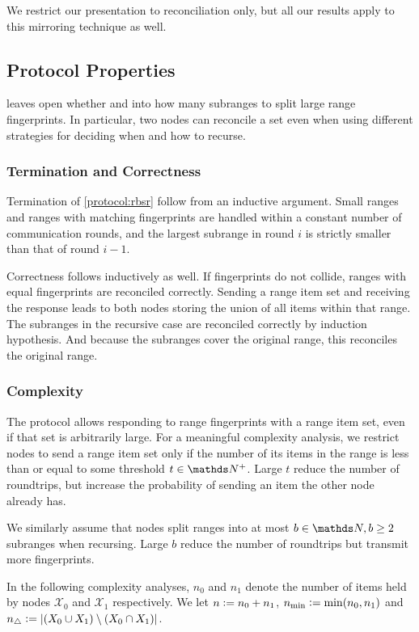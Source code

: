 \documentclass[conference]{IEEEtran}
\newcommand{\peer}[1]{\ensuremath{\mathcal{X}_{#1}}}
\begin{document}
We restrict our presentation to reconciliation only, but all our results apply to this mirroring technique as well.

\subsection{Protocol Properties}
 leaves open whether and into how many subranges to split large range fingerprints. In particular, two nodes can reconcile a set even when using different strategies for deciding when and how to recurse.

\subsubsection{Termination and Correctness}

Termination of \cref{protocol:rbsr} follow from an inductive argument. Small ranges and ranges with matching fingerprints are handled within a constant number of communication rounds, and the largest subrange in round $i$ is strictly smaller than that of round $i - 1$.

Correctness follows inductively as well. If fingerprints do not collide, ranges with equal fingerprints are reconciled correctly. Sending a range item set and receiving the response leads to both nodes storing the union of all items within that range. The subranges in the recursive case are reconciled correctly by induction hypothesis. And because the subranges cover the original range, this reconciles the original range.

\subsubsection{Complexity}

The protocol allows responding to range fingerprints with a range item set, even if that set is arbitrarily large. For a meaningful complexity analysis, we restrict nodes to send a range item set only if the number of its items in the range is less than or equal to some threshold $t \in \Np$. Large $t$ reduce the number of roundtrips, but increase the probability of sending an item the other node already has.

We similarly assume that nodes split ranges into at most $b \in \N, b \geq 2$ subranges when recursing. Large $b$ reduce the number of roundtrips but transmit more fingerprints.

In the following complexity analyses, $n_0$ and $n_1$ denote the number of items held by nodes \peer{0} and \peer{1} respectively. We let $n \vcentcolon= n_0 + n_1$, $n_{\min} \vcentcolon= \min(n_0, n_1)$ and $n_{\triangle} \vcentcolon= |{(X_0 \cup X_1) \setminus (X_0 \cap X_1)}|$.
\end{document}
